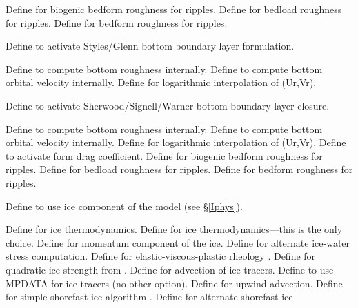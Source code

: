\begin{klist}
\begin{klist}
\begin{klist}
         Define for biogenic bedform roughness for
    ripples.
         Define for bedload roughness for ripples.
         Define for bedform roughness for ripples.
      \end{klist}
       Define to activate Styles/Glenn bottom
   boundary layer formulation.
      \begin{klist}
         Define to compute bottom roughness
     internally.
         Define to compute bottom orbital velocity
    internally.
          Define for logarithmic interpolation of
     (Ur,Vr).
      \end{klist}
       Define to activate Sherwood/Signell/Warner bottom
    boundary layer closure.
      \begin{klist}
         Define to compute bottom roughness
     internally.
         Define to compute bottom orbital velocity
    internally.
          Define for logarithmic interpolation of
     (Ur,Vr).
         Define to activate form drag
     coefficient.
         Define for biogenic bedform roughness for
    ripples.
         Define for bedload roughness for ripples.
         Define for bedform roughness for ripples.
      \end{klist}
  \end{klist}
  \mbox{}
    \begin{klist}
    Define to use ice component of the model (see
    \S\ref{Iphys}).
      \begin{klist}
         Define for ice thermodynamics.
         Define for \citet{Mellor89}
	ice thermodynamics---this is the only choice.
	 Define for momentum component of the ice.
	 Define for alternate ice-water stress
	computation.
	 Define for elastic-viscous-plastic rheology
	  \citep{Hunke97, Hunke_2001}.
	 Define for quadratic ice
   	  strength from \citet{Overland_1988}.
	 Define for advection of ice tracers.
	 Define to use MPDATA for ice tracers (no
	  other option).
	 Define for upwind advection.
	 Define for simple shorefast-ice
	  algorithm \citep{Budgell05}.
	 Define for alternate shorefast-ice

\end{klist}
\end{klist}
\end{klist}
